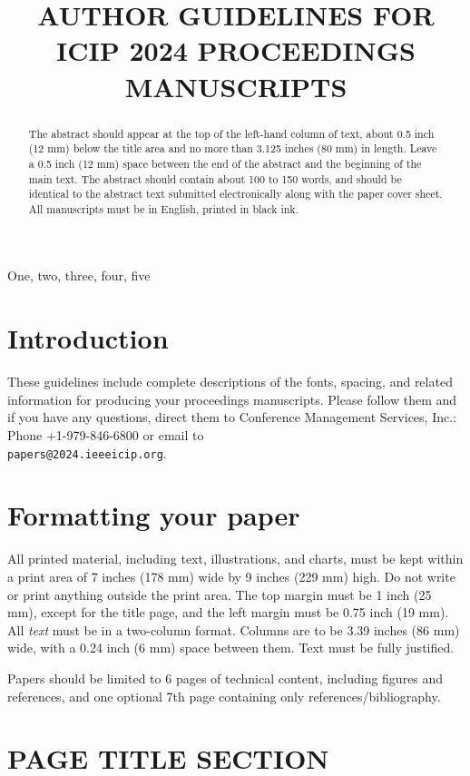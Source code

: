 \documentclass{article}
\title{AUTHOR GUIDELINES FOR ICIP 2024 PROCEEDINGS MANUSCRIPTS}
\begin{document}
%
\maketitle
%
\begin{abstract}
The abstract should appear at the top of the left-hand column of text, about
0.5 inch (12 mm) below the title area and no more than 3.125 inches (80 mm) in
length.  Leave a 0.5 inch (12 mm) space between the end of the abstract and the
beginning of the main text.  The abstract should contain about 100 to 150
words, and should be identical to the abstract text submitted electronically
along with the paper cover sheet.  All manuscripts must be in English, printed
in black ink.
\end{abstract}
%
\begin{keywords}
One, two, three, four, five
\end{keywords}
%
\section{Introduction}
\label{sec:intro}

These guidelines include complete descriptions of the fonts, spacing, and
related information for producing your proceedings manuscripts. Please follow
them and if you have any questions, direct them to Conference Management
Services, Inc.: Phone +1-979-846-6800 or email
to \\\texttt{papers@2024.ieeeicip.org}.

\section{Formatting your paper}
\label{sec:format}

All printed material, including text, illustrations, and charts, must be kept
within a print area of 7 inches (178 mm) wide by 9 inches (229 mm) high. Do
not write or print anything outside the print area. The top margin must be 1
inch (25 mm), except for the title page, and the left margin must be 0.75 inch
(19 mm).  All {\it text} must be in a two-column format. Columns are to be 3.39
inches (86 mm) wide, with a 0.24 inch (6 mm) space between them. Text must be
fully justified.

Papers should be limited to 6 pages of technical content, including figures and references,
and one optional 7th page containing only references/bibliography.

\section{PAGE TITLE SECTION}
\label{sec:pagestyle}
\end{document}

